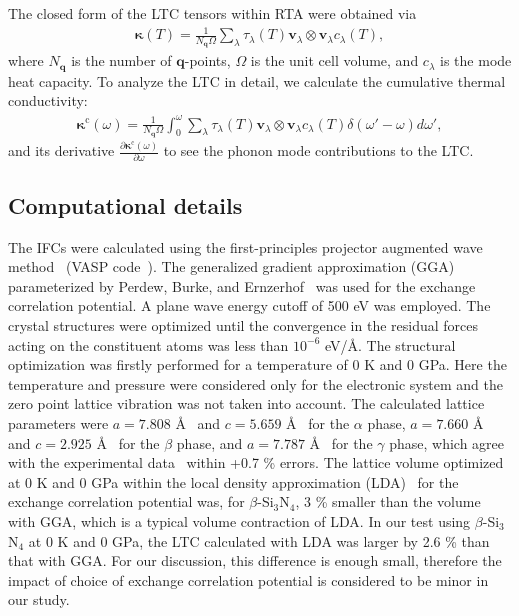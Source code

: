 \documentclass[twocolumn,amsmath,amssymb,a4paper,prb,superscriptaddress,floatfix]{revtex4-1}
\begin{document}
The closed form of the LTC tensors within RTA were obtained via
\begin{align}
 \label{eq:kappa}
 \boldsymbol{\kappa}(T) = \frac{1}{N_\mathbf{q}\Omega} \sum_\lambda
 \tau_\lambda(T) \mathbf{v}_\lambda \otimes \mathbf{v}_\lambda c_\lambda(T),
\end{align}
where $N_\mathbf{q}$ is the number of
$\mathbf{q}$-points, $\Omega$ is the unit cell volume, and $c_\lambda$
is the mode heat capacity. To analyze the LTC in detail, we calculate
the cumulative thermal conductivity:
\begin{align}
 \label{eq:cum-kappa}
 \boldsymbol{\kappa}^\text{c}(\omega) = \frac{1}{N_\mathbf{q}\Omega}
 \int_0^\omega \sum_\lambda
 \tau_\lambda(T) \mathbf{v}_\lambda \otimes \mathbf{v}_\lambda
 c_\lambda(T) \delta(\omega'-\omega)d\omega',
\end{align}
and its derivative $\frac{\partial
\boldsymbol{\kappa}^\text{c}(\omega)}{\partial \omega}$ to see the phonon mode
contributions to the LTC.


\subsection{Computational details}

The IFCs were calculated using the first-principles projector
augmented wave method~\cite{paw} (VASP code~\cite{vasp-1996,vasp-1995,
vasp-1999}). The generalized gradient approximation (GGA) parameterized by
Perdew, Burke, and Ernzerhof~\cite{pbe} was used for the exchange correlation
potential. A plane wave energy cutoff of 500 eV was employed. The crystal
structures were optimized until the convergence in the residual forces acting
on the constituent atoms was less than $10^{-6}$ eV/\AA. The structural
optimization was firstly performed for a temperature of 0 K and 0 GPa. Here the
temperature and pressure were considered only for the electronic system and the
zero point lattice vibration was not taken into account. The calculated lattice
parameters were $a=7.808$ \AA~ and $c=5.659$ \AA~ for the $\alpha$ phase,
$a=7.660$ \AA~ and $c=2.925$ \AA~ for the $\beta$ phase, and $a=7.787$ \AA~
for the $\gamma$ phase, which agree with the experimental
data~\cite{yashima,boulay,paszkowicz} within +0.7 \% errors. The lattice
volume optimized at 0 K and 0 GPa within the local density approximation
(LDA)~\cite{lda} for the exchange correlation potential was, for
$\beta$-Si$_3$N$_4$, 3 \% smaller than the volume with GGA, which is a typical
volume contraction of LDA. In our test using $\beta$-Si$_3$N$_4$ at 0 K and 0
GPa, the LTC calculated with LDA was larger by 2.6 \% than that with GGA. For
our discussion, this difference is enough small, therefore the impact of
choice of exchange correlation potential is considered to be minor in our
study.
\end{document}

